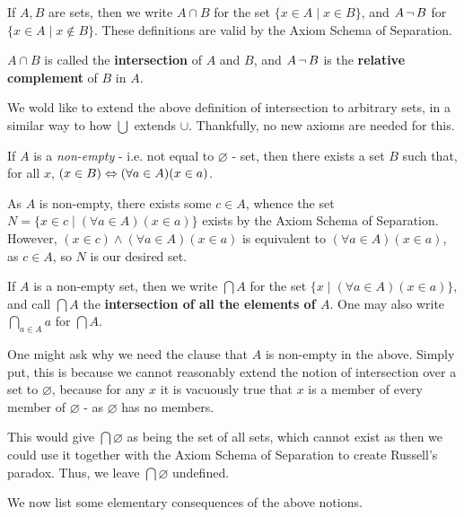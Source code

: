 \begin{defn}
\label{Defn:_Intersection_and_Complement}
If $A, B$ are sets, then we write $A\cap B$ for the set $\{x\in A\mid x\in B\}$, and $A \, \lnot \, B$ for $\{x\in A\mid x\notin B\}$. These definitions are valid by the Axiom Schema of Separation. 

$A\cap B$ is called the \textbf{intersection} of $A$ and $B$, and $A\, \lnot \, B$ is the \textbf{relative complement} of $B$ in $A$.
\end{defn}

We wold like to extend the above definition of intersection to arbitrary sets, in a similar way to how $\bigcup$ extends $\cup$. Thankfully, no new axioms are needed for this. 

\begin{thm}
\label{Thm:_Arbitrary_Intersections_are_well_defined}
If $A$ is a \emph{non-empty} - i.e. not equal to $\varnothing$ - set, then there exists a set $B$ such that, for all $x$, $(x\in B)\Leftrightarrow(\forall a\in A)(x\in a)$.
\end{thm}

\begin{prf}
As $A$ is non-empty, there exists some $c\in A$, whence the set $N = \{x\in c\mid (\forall a\in A)(x\in a)\}$ exists by the Axiom Schema of Separation. However, $(x\in c)\land(\forall a\in A)(x\in a)$ is equivalent to $(\forall a\in A)(x\in a)$, as $c\in A$, so $N$ is our desired set. 
\end{prf}

\begin{defn}
If $A$ is a non-empty set, then we write $\bigcap A$ for the set $\{x\mid (\forall a\in A)(x\in a)\}$, and call $\bigcap A$ the \textbf{intersection of all the elements of $A$}. One may also write $\bigcap_{a\in A} a$ for $\bigcap A$.
\end{defn}

One might ask why we need the clause that $A$ is non-empty in the above. Simply put, this is because we cannot reasonably extend the notion of intersection over a set to $\varnothing$, because for any $x$ it is vacuously true that $x$ is a member of every member of $\varnothing$ - as $\varnothing$ has no members. 

This would give $\bigcap \varnothing$ as being the set of all sets, which cannot exist as then we could use it together with the Axiom Schema of Separation to create Russell's paradox. Thus, we leave $\bigcap \varnothing$ undefined.

We now list some elementary consequences of the above notions. 

